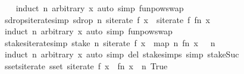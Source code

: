 \begin{isabellebody}
%
\isadelimproof
\ \ %
\endisadelimproof
%
\isatagproof
{}\isamarkupfalse%
\ {\isacharparenleft}induct\ n\ arbitrary{\isacharcolon}\ x{\isacharparenright}\ {\isacharparenleft}auto\ simp{\isacharcolon}\ funpow{\isacharunderscore}swap{}{\isacharparenright}%
\endisatagproof
{\isafoldproof}%
%
\isadelimproof
\isanewline
%
\endisadelimproof
\isanewline
{}\isamarkupfalse%
\ sdrop{\isacharunderscore}siterate{\isacharbrackleft}simp{\isacharbrackright}{\isacharcolon}\ {\isachardoublequoteopen}sdrop\ n\ {\isacharparenleft}siterate\ f\ x{\isacharparenright}\ {\isacharequal}\ siterate\ f\ {\isacharparenleft}{\isacharparenleft}f{\isacharcircum}{\isacharcircum}n{\isacharparenright}\ x{\isacharparenright}{\isachardoublequoteclose}\isanewline
%
\isadelimproof
\ \ %
\endisadelimproof
%
\isatagproof
{}\isamarkupfalse%
\ {\isacharparenleft}induct\ n\ arbitrary{\isacharcolon}\ x{\isacharparenright}\ {\isacharparenleft}auto\ simp{\isacharcolon}\ funpow{\isacharunderscore}swap{}{\isacharparenright}%
\endisatagproof
{\isafoldproof}%
%
\isadelimproof
\isanewline
%
\endisadelimproof
\isanewline
{}\isamarkupfalse%
\ stake{\isacharunderscore}siterate{\isacharbrackleft}simp{\isacharbrackright}{\isacharcolon}\ {\isachardoublequoteopen}stake\ n\ {\isacharparenleft}siterate\ f\ x{\isacharparenright}\ {\isacharequal}\ map\ {\isacharparenleft}{\isasymlambda}n{\isachardot}\ {\isacharparenleft}f{\isacharcircum}{\isacharcircum}n{\isacharparenright}\ x{\isacharparenright}\ {\isacharbrackleft}{}\ {\isachardot}{\isachardot}{\isacharless}\ n{\isacharbrackright}{\isachardoublequoteclose}\isanewline
%
\isadelimproof
\ \ %
\endisadelimproof
%
\isatagproof
{}\isamarkupfalse%
\ {\isacharparenleft}induct\ n\ arbitrary{\isacharcolon}\ x{\isacharparenright}\ {\isacharparenleft}auto\ simp\ del{\isacharcolon}\ stake{\isachardot}simps{\isacharparenleft}{}{\isacharparenright}\ simp{\isacharcolon}\ stake{\isacharunderscore}Suc{\isacharparenright}%
\endisatagproof
{\isafoldproof}%
%
\isadelimproof
\isanewline
%
\endisadelimproof
\isanewline
{}\isamarkupfalse%
\ sset{\isacharunderscore}siterate{\isacharcolon}\ {\isachardoublequoteopen}sset\ {\isacharparenleft}siterate\ f\ x{\isacharparenright}\ {\isacharequal}\ {\isacharbraceleft}{\isacharparenleft}f{\isacharcircum}{\isacharcircum}n{\isacharparenright}\ x\ {\isacharbar}\ n{\isachardot}\ True{\isacharbraceright}{\isachardoublequoteclose}\isanewline
%
\isadelimproof
\ \ %
\endisadelimproof
%
\isatagproof
{}\isamarkupfalse%

\end{isabellebody}
